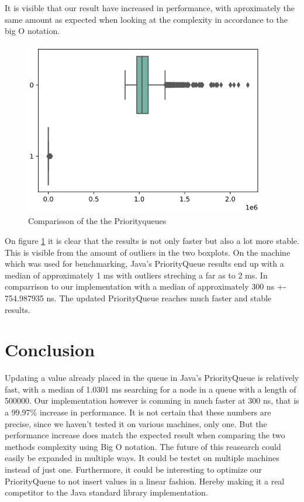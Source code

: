 \documentclass{article}
\begin{document}
It is visible that our result have increased in performance, with aproximately the same amount as expected when looking at the complexity in accordance to the big O notation.



\begin{figure}[H]
\label{img:boxplot_comparisson}
\includegraphics[width=300pt]{boxplot_comparisson}
\caption{Comparisson of the the Priorityqueues}
\end{figure}

On figure \ref{img:boxplot_comparisson} it is clear that the results is not only faster 
but also a lot more stable. This is visible from the amount of outliers in the two boxplots. 
On the machine which was used for benchmarking, Java's PriorityQueue results end up with a
median of approximately 1 ms with outliers streching a far as to 2 ms. In comparrison to 
our implementation with a median of approximately 300 ns +- 754.987935 ns. The updated 
PriorityQueue reaches much faster and stable results.  

\section{Conclusion} %
Updating a value already placed in the queue in Java's PriorityQueue is relatively
fast, with a median of 1.0301 ms searching for a node in a queue with a length of 
500000. Our implementation however is comming in much faster at 300 ns, that is a 99.97\% 
increase in performance. It is not certain that these numbers are precise, since we haven't 
tested it on various machines, only one. But the performance increase does match the expected result 
when comparing the two methods complexity using Big O notation. 
The future of this reasearch could easily be expanded in multiple ways.
It could be testet on multiple machines instead of just one. Furthermore, it could be interesting
to optimize our PriorityQueue to not insert values in a linear fashion. Hereby making it a 
real competitor to the Java standard library implementation.




\end{document}
